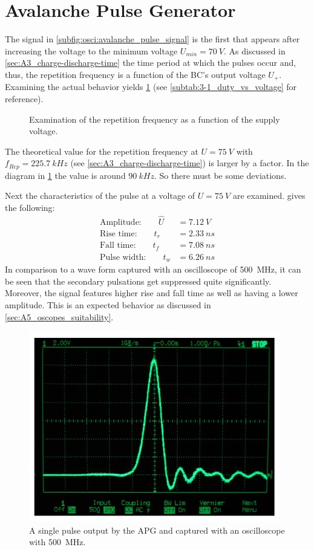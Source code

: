 \section{Avalanche Pulse Generator}
    The signal in \cref{subfig:osci:avalanche_pulse_signal} is the first that appears after increasing the voltage to the minimum
    voltage $ U_{min}=\SI{70}{V} $. As discussed in \cref{sec:A3_charge-discharge-time} the time period at which the pulses
    occur and, thus, the repetition frequency is a function of the BC's output voltage \( U_+ \). Examining the
    actual behavior yields \cref{fig:repetition-frequency} (see \cref{subtab:3-1_duty_vs_voltage} for reference).
    \begin{figure}[H]
        \centering
        
        \caption[Examination repetition frequency over supply voltage]{Examination of the repetition frequency as a function of the supply voltage.}
        \label{fig:repetition-frequency}
    \end{figure}
    The theoretical value for the repetition frequency at $ U=\SI{75}{V} $ with $ f_{Rep}=\SI{225.7}{kHz} $ (see \cref{sec:A3_charge-discharge-time})
    is larger by a factor. In the diagram in \cref{fig:repetition-frequency} the value is around
    $ \SI{90}{kHz} $. So there must be some deviations.\par\medskip
    Next the characteristics of the pulse at a voltage of $ U=\SI{75}{V} $ are examined. 
    gives the following:
    \begin{align}
        \text{Amplitude:}\qquad \hat{U}&=\SI{7.12}{V}\\
        \text{Rise time:}\qquad t_r&=\SI{2.33}{ns}\\
        \text{Fall time:}\qquad t_f&=\SI{7.08}{ns}\\
        \text{Pulse width:}\qquad t_w&=\SI{6.26}{ns}
    \end{align}
    In comparison to a wave form captured with an oscilloscope of \SI{500}{MHz}, it can be seen that the secondary pulsations get suppressed
    quite significantly. Moreover, the signal features higher rise and fall time as well as having a lower amplitude.
    This is an expected behavior as discussed in \cref{sec:A5_oscopes_suitability}.
    \begin{figure}[H]
        \centering
        \includegraphics[width=.4\textwidth]{messdaten/500mhz_waveform.jpg}
        \caption[Pulse captured with a \SI{500}{MHz} oscilloscope]{A single pulse output by the APG and captured with an oscilloscope with \SI{500}{MHz}.}
        \label{fig:500MHz_waveform}
    \end{figure}
